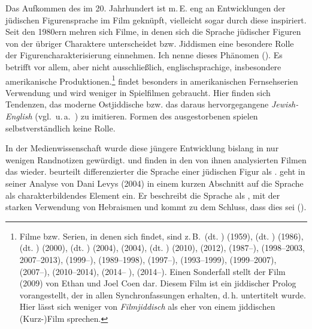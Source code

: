 Das Aufkommen des \hai{{\LiJizwei}} im 20. Jahrhundert ist m.\,E. eng an Entwicklungen der jüdischen Figurensprache im Film geknüpft, vielleicht sogar durch diese inspiriert. Seit den 1980ern mehren sich Filme, in denen sich die Sprache jüdischer Figuren von der übriger Charaktere unterscheidet bzw. Jiddismen eine besondere Rolle der Figurencharakterisierung einnehmen. Ich nenne dieses Phänomen  (\hai{{\FiJi}}). Es betrifft vor allem, aber nicht ausschließlich, englischsprachige, insbesondere amerikanische Produktionen.\footnote{Filme bzw. Serien, in denen sich \hai{{\FiJi}} findet, sind z.\,B.\,  (dt. ) (1959),  (dt. ) (1986),  (dt. ) (2000),  (dt. ) (2004),  (2004),  (dt. ) (2010),  (2012),  (1987–),  (1998–2003, 2007–2013),  (1999–),  (1989–1998),  (1997–), (1993–1999),  (1999–2007),  (2007–),  (2010–2014),  (2014– ),  (2014–). Einen Sonderfall stellt der Film  (2009) von Ethan und Joel Coen dar. Diesem Film ist ein jiddischer Prolog vorangestellt, der in allen Synchronfassungen erhalten, d.\,h. untertitelt wurde. Hier lässt sich weniger von \textit{Filmjiddisch} als eher von einem jiddischen (Kurz-)Film sprechen.} \hai{{\FiJi}} findet besonders in amerikanischen Fernsehserien Verwendung und wird weniger in Spielfilmen gebraucht. Hier finden sich Tendenzen, das moderne Ostjiddische bzw. das daraus hervorgegangene \textit{Jewish-English} (vgl.\, u.\,a.\, \citealt{Fishman1985,Gold1985,Benor2009}) zu imitieren. Formen des ausgestorbenen  spielen selbstverständlich keine Rolle.

In der Medienwissenschaft wurde diese jüngere Entwicklung bislang in nur wenigen Randnotizen gewürdigt. \cite[129]{Bothe2013} und \cite[383]{Zeifert2013} finden in den von ihnen analysierten Filmen das  wieder. \cite[90]{Haselberg2013} beurteilt differenzierter die Sprache einer jüdischen Figur als . \cite[78]{Lubrich2008} geht in seiner Analyse von Dani Levys  (2004) in einem kurzen Abschnitt auf die Sprache als charakterbildendes Element ein. Er beschreibt die Sprache als ,  mit der starken Verwendung von Hebraismen und kommt zu dem Schluss, dass dies  sei (\citealt[78]{Lubrich2008}).


